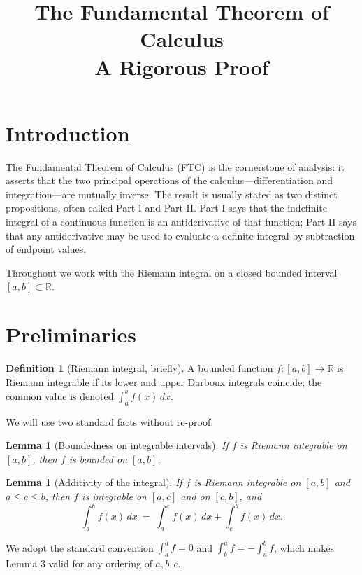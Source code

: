 \documentclass{article}
\newtheorem{lemma}[theorem]{Lemma}
\theoremstyle{definition}
\newtheorem{definition}[theorem]{Definition}
\begin{document}
\title{The Fundamental Theorem of Calculus\\A Rigorous Proof}
\maketitle

\section{Introduction}

The Fundamental Theorem of Calculus (FTC) is the cornerstone of analysis: it asserts that the two principal operations of the calculus---differentiation and integration---are mutually inverse. The result is usually stated as two distinct propositions, often called Part I and Part II. Part I says that the indefinite integral of a continuous function is an antiderivative of that function; Part II says that any antiderivative may be used to evaluate a definite integral by subtraction of endpoint values.

Throughout we work with the Riemann integral on a closed bounded interval $[a,b]\subset\mathbb{R}$.

\section{Preliminaries}

\begin{definition}[Riemann integral, briefly]
A bounded function $f\colon[a,b]\to\mathbb{R}$ is Riemann integrable if its lower and upper Darboux integrals coincide; the common value is denoted $\int_{a}^{b}f(x)\,dx$.
\end{definition}

We will use two standard facts without re-proof.

\begin{lemma}[Boundedness on integrable intervals]
If $f$ is Riemann integrable on $[a,b]$, then $f$ is bounded on $[a,b]$.
\end{lemma}

\begin{lemma}[Additivity of the integral]
If $f$ is Riemann integrable on $[a,b]$ and $a\leq c\leq b$, then $f$ is integrable on $[a,c]$ and on $[c,b]$, and
$$\int_{a}^{b}f(x)\,dx\ =\ \int_{a}^{c}f(x)\,dx+\int_{c}^{b}f(x)\,dx.$$
\end{lemma}

We adopt the standard convention $\int_{a}^{a}f=0$ and $\int_{b}^{a}f=-\int_{a}^{b}f$, which makes Lemma 3 valid for any ordering of $a,b,c$.
\end{document}
